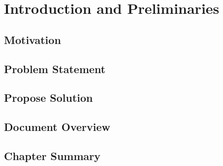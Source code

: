 \chapter{Introduction and Preliminaries}
\section{Motivation}
\section{Problem Statement}
\section{Propose Solution}
\section{Document Overview}
\section{Chapter Summary}

